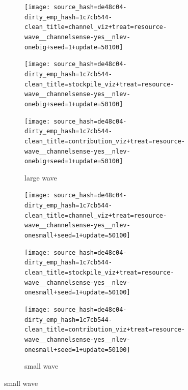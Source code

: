 \begin{figure}[!htbp]
\begin{center}
\begin{subfigure}[b]{\textwidth}
  \begin{minipage}{0.2\textwidth}
  \texttt{[image: source\_hash=de48c04-dirty\_emp\_hash=1c7cb544-clean\_title=channel\_viz+treat=resource-wave\_\_channelsense-yes\_\_nlev-onebig+seed=1+update=50100]}
  \end{minipage}
  \begin{minipage}{0.2\textwidth}
  \texttt{[image: source\_hash=de48c04-dirty\_emp\_hash=1c7cb544-clean\_title=stockpile\_viz+treat=resource-wave\_\_channelsense-yes\_\_nlev-onebig+seed=1+update=50100]}
  \end{minipage}
  \begin{minipage}{0.2\textwidth}
  \texttt{[image: source\_hash=de48c04-dirty\_emp\_hash=1c7cb544-clean\_title=contribution\_viz+treat=resource-wave\_\_channelsense-yes\_\_nlev-onebig+seed=1+update=50100]}
  \end{minipage}
  \begin{minipage}{0.2\textwidth}
  \caption{
  large wave
  }
  \label{fig:TODO}
  \end{minipage}
\end{subfigure}

\begin{subfigure}[b]{\textwidth}
  \begin{minipage}{0.2\textwidth}
  \texttt{[image: source\_hash=de48c04-dirty\_emp\_hash=1c7cb544-clean\_title=channel\_viz+treat=resource-wave\_\_channelsense-yes\_\_nlev-onesmall+seed=1+update=50100]}
  \end{minipage}
  \begin{minipage}{0.2\textwidth}
  \texttt{[image: source\_hash=de48c04-dirty\_emp\_hash=1c7cb544-clean\_title=stockpile\_viz+treat=resource-wave\_\_channelsense-yes\_\_nlev-onesmall+seed=1+update=50100]}
  \end{minipage}
  \begin{minipage}{0.2\textwidth}
  \texttt{[image: source\_hash=de48c04-dirty\_emp\_hash=1c7cb544-clean\_title=contribution\_viz+treat=resource-wave\_\_channelsense-yes\_\_nlev-onesmall+seed=1+update=50100]}
  \end{minipage}
  \begin{minipage}{0.2\textwidth}
  \caption{
  small wave
  }
  \label{fig:TODO}
  \end{minipage}
\end{subfigure}


\end{center}
\end{figure}
